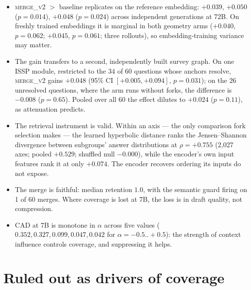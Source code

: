 \documentclass[11pt]{article}
\begin{document}
\begin{itemize}
  \item \textsc{merge\_v2} $>$ baseline replicates on the reference embedding:
    $+0.039$, $+0.050$ ($p{=}0.014$), $+0.048$ ($p{=}0.024$) across independent
    generations at 72B. On freshly trained embeddings it is marginal in both
    geometry arms ($+0.040$, $p{=}0.062$; $+0.045$, $p{=}0.061$; three
    rollouts), so embedding-training variance may matter.
  \item The gain transfers to a second, independently built survey graph. On one
    ISSP module, restricted to the $34$ of $60$ questions whose anchors resolve,
    \textsc{merge\_v2} gains $+0.048$ (95\% CI $[+0.005, +0.094]$, $p{=}0.031$);
    on the $26$ unresolved questions, where the arm runs without forks, the
    difference is $-0.008$ ($p{=}0.65$). Pooled over all 60 the effect dilutes to
    $+0.024$ ($p{=}0.11$), as attenuation predicts.
  \item The retrieval instrument is valid. Within an axis --- the only comparison
    fork selection makes --- the learned hyperbolic distance ranks the
    Jensen--Shannon divergence between subgroups' answer distributions at
    $\rho = +0.755$ (2{,}027 axes; pooled $+0.529$; shuffled null $-0.000$),
    while the encoder's own input features rank it at only $+0.074$. The encoder
    recovers ordering its inputs do not expose.
  \item The merge is faithful: median retention $1.0$, with the semantic guard
    firing on 1 of 60 merges. Where coverage is lost at 7B, the loss is in draft
    quality, not compression.
  \item CAD at 7B is monotone in $\alpha$ across five values
    ($0.352, 0.327, 0.099, 0.047, 0.042$ for $\alpha = -0.5..{+}0.5$): the
    strength of context influence controls coverage, and suppressing it helps.
\end{itemize}

\section{Ruled out as drivers of coverage}
\end{document}
